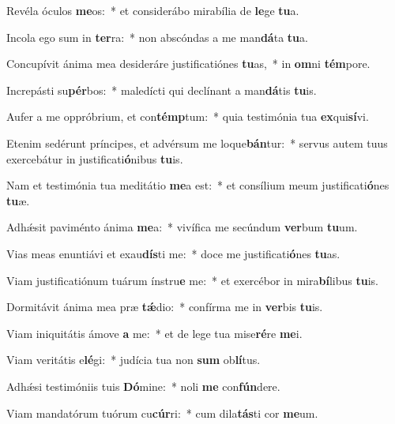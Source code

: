\item Revéla óculos \textbf{me}os:~* et considerábo mirabília de \textbf{le}ge \textbf{tu}a.
\item Incola ego sum in \textbf{ter}ra:~* non abscóndas a me man\textbf{dá}ta \textbf{tu}a.
\item Concupívit ánima mea desideráre justificatiónes \textbf{tu}as,~* in \textbf{om}ni \textbf{tém}pore.
\item Increpásti su\textbf{pér}bos:~* maledícti qui declínant a man\textbf{dá}tis \textbf{tu}is.
\item Aufer a me oppróbrium, et con\textbf{témp}tum:~* quia testimónia tua \textbf{ex}qui\textbf{sí}vi.
\item Etenim sedérunt príncipes, et advérsum me loque\textbf{bán}tur:~* servus autem tuus exercebátur in justificati\textbf{ó}nibus \textbf{tu}is.
\item Nam et testimónia tua meditátio \textbf{me}a est:~* et consílium meum justificati\textbf{ó}nes \textbf{tu}æ.
\item Adhǽsit paviménto ánima \textbf{me}a:~* vivífica me secúndum \textbf{ver}bum \textbf{tu}um.
\item Vias meas enuntiávi et exau\textbf{dís}ti me:~* doce me justificati\textbf{ó}nes \textbf{tu}as.
\item Viam justificatiónum tuárum ínstru\textbf{e} me:~* et exercébor in mira\textbf{bí}libus \textbf{tu}is.
\item Dormitávit ánima mea præ \textbf{tǽ}dio:~* confírma me in \textbf{ver}bis \textbf{tu}is.
\item Viam iniquitátis ámove \textbf{a} me:~* et de lege tua mise\textbf{ré}re \textbf{me}i.
\item Viam veritátis e\textbf{lé}gi:~* judícia tua non \textbf{sum} ob\textbf{lí}tus.
\item Adhǽsi testimóniis tuis \textbf{Dó}mine:~* noli \textbf{me} con\textbf{fún}dere.
\item Viam mandatórum tuórum cu\textbf{cúr}ri:~* cum dila\textbf{tás}ti cor \textbf{me}um.
